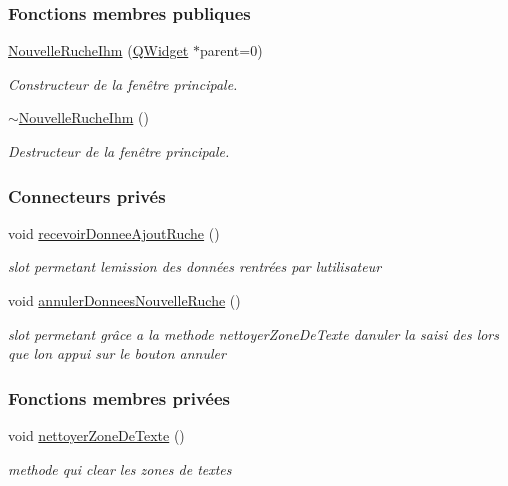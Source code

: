\subsubsection*{Fonctions membres publiques}
\begin{DoxyCompactItemize}
\item 
\hyperlink{class_nouvelle_ruche_ihm_a338b9af0b96ed0839a8d5008c8c89cc4}{Nouvelle\+Ruche\+Ihm} (\hyperlink{class_q_widget}{Q\+Widget} $\ast$parent=0)
\begin{DoxyCompactList}\small\item\em Constructeur de la fenêtre principale. \end{DoxyCompactList}\item 
\hyperlink{class_nouvelle_ruche_ihm_a17e5dfd1146574134eaa3ab8eae4f6d4}{$\sim$\+Nouvelle\+Ruche\+Ihm} ()
\begin{DoxyCompactList}\small\item\em Destructeur de la fenêtre principale. \end{DoxyCompactList}\end{DoxyCompactItemize}
\subsubsection*{Connecteurs privés}
\begin{DoxyCompactItemize}
\item 
void \hyperlink{class_nouvelle_ruche_ihm_a268e781b033f2531ca5eab19cc828fdc}{recevoir\+Donnee\+Ajout\+Ruche} ()
\begin{DoxyCompactList}\small\item\em slot permetant l\textquotesingle{}emission des données rentrées par l\textquotesingle{}utilisateur \end{DoxyCompactList}\item 
void \hyperlink{class_nouvelle_ruche_ihm_a8967974b5606b7096960f3b607b5b58a}{annuler\+Donnees\+Nouvelle\+Ruche} ()
\begin{DoxyCompactList}\small\item\em slot permetant grâce a la methode nettoyer\+Zone\+De\+Texte d\textquotesingle{}anuler la saisi des lors que l\textquotesingle{}on appui sur le bouton annuler \end{DoxyCompactList}\end{DoxyCompactItemize}
\subsubsection*{Fonctions membres privées}
\begin{DoxyCompactItemize}
\item 
void \hyperlink{class_nouvelle_ruche_ihm_a09ddd61a2bd2b6779865e7d3b93ec2eb}{nettoyer\+Zone\+De\+Texte} ()
\begin{DoxyCompactList}\small\item\em methode qui clear les zones de textes \end{DoxyCompactList}\end{DoxyCompactItemize}
